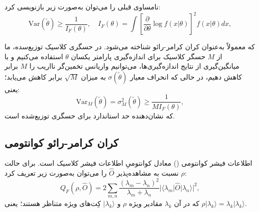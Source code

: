 نامساوی قبلی را می‌توان به‌صورت زیر بازنویسی کرد:
\begin{equation}
	\text{Var}(\tilde{\theta}) \geq \frac{1}{I_F(\theta)}, \quad I_F(\theta) = \int \left[ \frac{\partial}{\partial \theta} \log f(x|\theta) \right]^2 f(x|\theta) dx,
	\label{eq:11-41}
\end{equation}

که معمولاً به‌عنوان کران کرامر-رائو شناخته می‌شود. در حسگری کلاسیک توزیع‌سده، ما از $M$ حسگر کلاسیک برای اندازه‌گیری پارامتر یکسان $\theta$ استفاده می‌کنیم و با میانگین‌گیری از نتایج اندازه‌گیری‌ها، می‌توانیم واریانس تخمین‌گر نااریب را $M$ برابر کاهش دهیم، در حالی که انحراف معیار $\sigma(\tilde{\theta})$ به میزان $\sqrt{M}$ برابر کاهش می‌یابد؛ یعنی:
\begin{equation}
	\text{Var}_M(\tilde{\theta}) = \sigma_M^2(\tilde{\theta}) \geq \frac{1}{M I_F(\theta)},
	\label{eq:11-42}
\end{equation}
که نشان‌دهنده حد استاندارد برای حسگری توزیع‌شده است.

\subsection{کران کرامر-رائو کوانتومی}
\label{subsec:11-2-2}
اطلاعات فیشر کوانتومی () معادل کوانتومیِ اطلاعات فیشر کلاسیک است.  برای حالت $\rho$ نسبت به مشاهده‌پذیر $\hat{O}$ را می‌توان به‌صورت زیر تعریف کرد:
\begin{equation}
	Q_F(\rho, \hat{O}) = 2 \sum_{m,n} \frac{(\lambda_m - \lambda_n)^2}{\lambda_m + \lambda_n} |\langle \lambda_m | \hat{O} | \lambda_n \rangle|^2,
	\label{eq:11-43}
\end{equation}
که در آن $\lambda_k$ مقادیر ویژه $\rho$ و $|\lambda_k\rangle$ کِت‌های ویژه متناظر هستند؛ یعنی $\rho|\lambda_k\rangle = \lambda_k|\lambda_k\rangle$.

